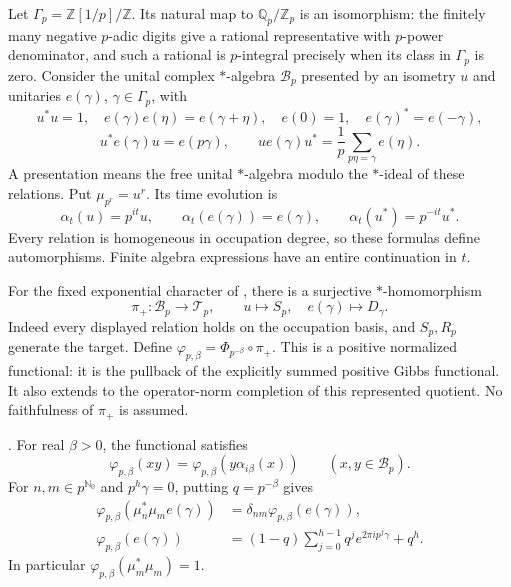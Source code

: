 Let $\Gamma_p=\mathbb Z[1/p]/\mathbb Z$. Its natural map to
$\mathbb Q_p/\mathbb Z_p$ is an isomorphism: the finitely many
negative $p$-adic digits give a rational representative with
$p$-power denominator, and such a rational is $p$-integral
precisely when its class in $\Gamma_p$ is zero. Consider the unital
complex $*$-algebra $\mathcal B_p$ presented by an isometry $u$
and unitaries $e(\gamma)$, $\gamma\in\Gamma_p$, with
\[
 u^*u=1,\quad e(\gamma)e(\eta)=e(\gamma+\eta),\quad
 e(0)=1,\quad e(\gamma)^*=e(-\gamma),
\]
\[
 u^*e(\gamma)u=e(p\gamma),\qquad
 ue(\gamma)u^*=\frac1p\sum_{p\eta=\gamma}e(\eta).
\]
A presentation means the free unital $*$-algebra modulo the
$*$-ideal of these relations. Put $\mu_{p^r}=u^r$.
Its time evolution is
\begin{equation}
 \alpha_t(u)=p^{it}u,\qquad
 \alpha_t(e(\gamma))=e(\gamma),\qquad
 \alpha_t(u^*)=p^{-it}u^*.
 \label{v4-arith:kms-gns:eq:sigma-time}
\end{equation}
Every relation is homogeneous in occupation degree, so these
formulas define automorphisms. Finite algebra expressions have
an entire continuation in $t$.

For the fixed exponential character of
, there is a surjective
$*$-homomorphism
\[
 \pi_+:\mathcal B_p\longrightarrow\mathcal T_p,
 \qquad u\mapsto S_p,\quad e(\gamma)\mapsto D_\gamma.
\]
Indeed every displayed relation holds on the occupation basis,
and $S_p,R_p$ generate the target. Define
$\varphi_{p,\beta}=\Phi_{p^{-\beta}}\circ\pi_+$.
This is a positive normalized functional: it is the pullback of
the explicitly summed positive Gibbs functional. It also extends
to the operator-norm completion of this represented quotient.
No faithfulness of $\pi_+$ is assumed.

\begin{lemma}
\label{v4-arith:kms-gns:lem:KMS-property}
\ClaimStatusProvedHere. For real $\beta>0$, the functional satisfies
\begin{equation}
 \varphi_{p,\beta}(xy)
   =\varphi_{p,\beta}(y\alpha_{i\beta}(x))
       \qquad(x,y\in\mathcal B_p).
 \label{v4-arith:kms-gns:eq:KMS}
\end{equation}
For $n,m\in p^{\mathbb N_0}$ and $p^h\gamma=0$, putting
$q=p^{-\beta}$ gives
\begin{align}
 \varphi_{p,\beta}(\mu_n^*\mu_m e(\gamma))
   &=\delta_{nm}\varphi_{p,\beta}(e(\gamma)),
       \label{v4-arith:kms-gns:eq:phi-1}\\
 \varphi_{p,\beta}(e(\gamma))
   &=(1-q)\sum_{j=0}^{h-1}q^j e^{2\pi i p^j\gamma}+q^h.
       \label{v4-arith:kms-gns:eq:phase-state}
\end{align}
In particular $\varphi_{p,\beta}(\mu_m^*\mu_m)=1$.
\end{lemma}

